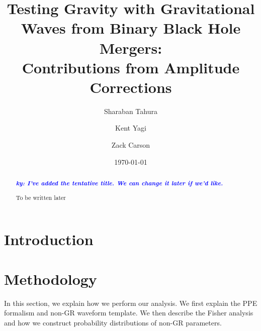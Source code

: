\documentclass[prd,twocolumn,nofootinbib]{revtex4-1}
\newcommand{\ky}[1]{\textcolor{blue}{\it{\textbf{ky: #1}}} }
\begin{document}
\title{Testing Gravity with Gravitational Waves from Binary Black Hole Mergers: \\ Contributions from Amplitude Corrections}

\author{Sharaban Tahura}

\author{Kent Yagi}

\author{Zack Carson}

\begin{abstract}

\ky{I've added the tentative title. We can change it later if we'd like.}



To be written later
\end{abstract}

\date{\today}




\maketitle




\section{Introduction}

\section{Methodology}\label{section:method}

In this section, we explain how we perform our analysis. We first explain the PPE formalism and non-GR waveform template. We then describe the Fisher analysis and how we construct probability distributions of non-GR parameters.

\end{document}
